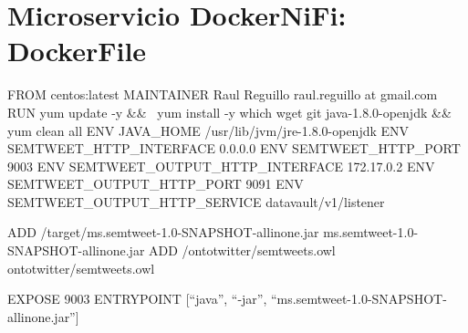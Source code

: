 \chapter{Microservicio DockerNiFi: DockerFile}
\label{chap:ms.semtweet.docker}
\begin{listing}[
  language = bash,
  numbers=left,
  numberstyle=\tiny,
  stepnumber=5,
  numbersep=5pt,
  frame=single,
  caption  = {ms.semtweet: DockerFile},
  label    = code:ms.semtweet.dockerfile]

FROM centos:latest
MAINTAINER Raul Reguillo raul.reguillo at gmail.com
RUN yum update -y && \
yum install -y which wget git java-1.8.0-openjdk && yum clean all
ENV JAVA_HOME /usr/lib/jvm/jre-1.8.0-openjdk
ENV SEMTWEET_HTTP_INTERFACE 0.0.0.0
ENV SEMTWEET_HTTP_PORT 9003
ENV SEMTWEET_OUTPUT_HTTP_INTERFACE 172.17.0.2
ENV SEMTWEET_OUTPUT_HTTP_PORT 9091
ENV SEMTWEET_OUTPUT_HTTP_SERVICE datavault/v1/listener

ADD /target/ms.semtweet-1.0-SNAPSHOT-allinone.jar ms.semtweet-1.0-SNAPSHOT-allinone.jar
ADD /ontotwitter/semtweets.owl ontotwitter/semtweets.owl

EXPOSE 9003
ENTRYPOINT [``java'', ``-jar'', ``ms.semtweet-1.0-SNAPSHOT-allinone.jar'']


\end{listing}
